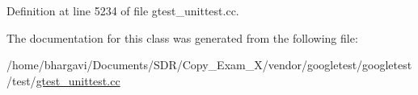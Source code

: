 Definition at line 5234 of file gtest\+\_\+unittest.\+cc.



The documentation for this class was generated from the following file\+:\begin{DoxyCompactItemize}
\item 
/home/bhargavi/\+Documents/\+S\+D\+R/\+Copy\+\_\+\+Exam\+\_\+X/vendor/googletest/googletest/test/\hyperlink{gtest__unittest_8cc}{gtest\+\_\+unittest.\+cc}\end{DoxyCompactItemize}
